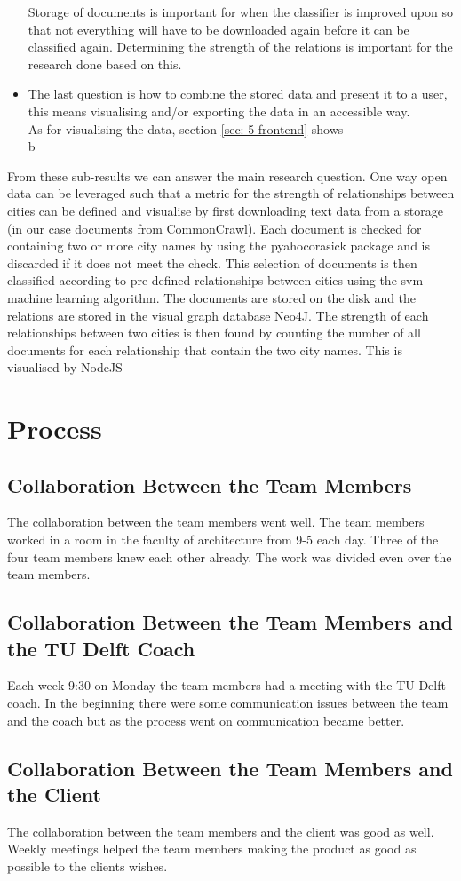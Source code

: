 \begin{itemize}
    Storage of documents is important for when the classifier is improved upon so that not everything will have to be downloaded again before it can be classified again. Determining the strength of the relations is important for the research done based on this.
    
    \item The last question is how to combine the stored data and present it to a user, this means visualising and/or exporting the data in an accessible way.\\
    
    As for visualising the data, section \ref{sec: 5-frontend} shows 
    \\
    \todo{}
    b
\end{itemize}

From these sub-results we can answer the main research question. One way open data can be leveraged such that a metric for the strength of relationships between cities can be defined and visualise by first downloading text data from a storage (in our case documents from CommonCrawl). Each document is checked for containing two or more city names by using the pyahocorasick package and is discarded if it does not meet the check. This selection of documents is then classified according to pre-defined relationships between cities using the svm machine learning algorithm. The documents are stored on the disk and the relations are stored in the visual graph database Neo4J. The strength of each relationships between two cities is then found by counting the number of all documents for each relationship that contain the two city names. This is visualised by NodeJS 

\section{Process}

\subsection{Collaboration Between the Team Members}
The collaboration between the team members went well. The team members worked in a room in the faculty of architecture from 9-5 each day. Three of the four team members knew each other already. The work was divided even over the team members. 

\subsection{Collaboration Between the Team Members and the TU Delft Coach}
Each week 9:30 on Monday the team members had a meeting with the TU Delft coach. In the beginning there were some communication issues between the team and the coach but as the process went on communication became better.

\subsection{Collaboration Between the Team Members and the Client}
The collaboration between the team members and the client was good as well. 
Weekly meetings helped the team members making the product as good as possible to the clients wishes. 